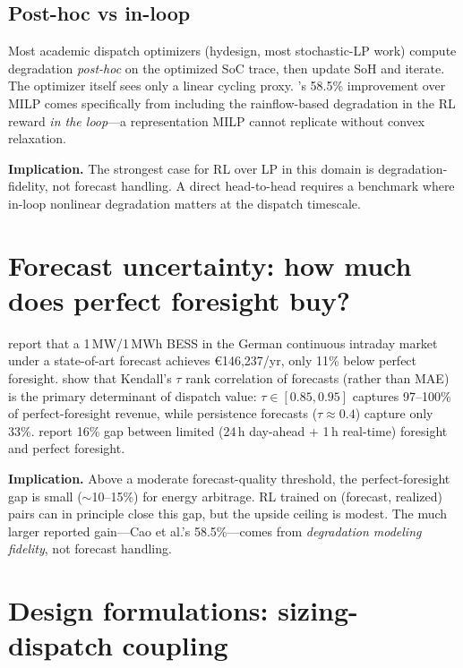 \documentclass[11pt]{article}
\begin{document}
\subsection{Post-hoc vs in-loop}

Most academic dispatch optimizers (hydesign, most stochastic-LP work) compute degradation \emph{post-hoc} on the optimized SoC trace, then update SoH and iterate. The optimizer itself sees only a linear cycling proxy. \citet{cao2020drl}'s 58.5\% improvement over MILP comes specifically from including the rainflow-based degradation in the RL reward \emph{in the loop}---a representation MILP cannot replicate without convex relaxation.

\textbf{Implication.} The strongest case for RL over LP in this domain is degradation-fidelity, not forecast handling. A direct head-to-head requires a benchmark where in-loop nonlinear degradation matters at the dispatch timescale.

\section{Forecast uncertainty: how much does perfect foresight buy?}

\citet{burlando2025foresight} report that a 1\,MW/1\,MWh BESS in the German continuous intraday market under a state-of-art forecast achieves \euro146{,}237/yr, only 11\% below perfect foresight. \citet{hancock2026rankcorrelation} show that Kendall's $\tau$ rank correlation of forecasts (rather than MAE) is the primary determinant of dispatch value: $\tau \in [0.85, 0.95]$ captures 97--100\% of perfect-foresight revenue, while persistence forecasts (\(\tau \approx 0.4\)) capture only 33\%. \citet{krishnamurthy2018stochastic} report 16\% gap between limited (24\,h day-ahead + 1\,h real-time) foresight and perfect foresight.

\textbf{Implication.} Above a moderate forecast-quality threshold, the perfect-foresight gap is small (\(\sim\)10--15\%) for energy arbitrage. RL trained on (forecast, realized) pairs can in principle close this gap, but the upside ceiling is modest. The much larger reported gain---Cao et al.'s 58.5\%---comes from \emph{degradation modeling fidelity}, not forecast handling.

\section{Design formulations: sizing-dispatch coupling}
\end{document}
